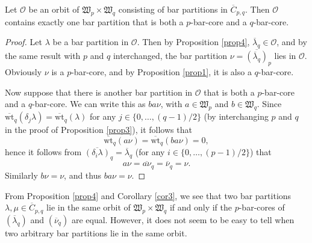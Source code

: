 \documentclass[ALCO, Unicode,published]{cedram}
\newcommand*\nicefrac[2]{#1/#2}
\begin{document}
\begin{coro}\label{cor3}
Let $\mathcal{O}$ be an orbit of $\mathfrak{W}_p\times\mathfrak{W}_q$ consisting of bar partitions in $\overline{C}_{p,q}$. Then $\mathcal{O}$ contains exactly one bar partition that is both a $p$-bar-core and a $q$-bar-core.
\end{coro}
\begin{proof}
Let $\lambda$ be a bar partition in $\mathcal{O}$. Then by Proposition \ref{prop4}, $\overline{\lambda}_q\in\mathcal{O}$, and by the same result with $p$ and $q$ interchanged, the bar partition $\nu=\overline{(\overline{\lambda}_q)}_p$ lies in $\mathcal{O}$. Obviously $\nu$ is a $p$-bar-core, and by Proposition \ref{prop1}, it is also a $q$-bar-core.

Now suppose that there is another bar partition in $\mathcal{O}$ that is both a $p$-bar-core and a $q$-bar-core. We can write this as $ba\nu$, with $a\in\mathfrak{W}_p$ and $b\in\mathfrak{W}_q$. Since $\overline{\text{wt}}_q(\delta_j\lambda)=\overline{\text{wt}}_q(\lambda)$ for any $j\in\{0,\dots,\nicefrac{(q-1)}{2}\}$ (by interchanging $p$ and $q$ in the proof of Proposition \ref{prop3}), it follows that 
$$\overline{\text{wt}}_q(a\nu)=\overline{\text{wt}}_q(ba\nu)=0,$$ 
hence it follows from $\overline{(\delta_i\lambda)}_q=\overline{\lambda}_q$ (for any $i\in\{0,\dots,\nicefrac{(p-1)}{2}\}$) that 
$$a\nu=\overline{a\nu}_q=\overline{\nu}_q=\nu.$$ 
Similarly $b\nu=\nu$, and thus $ba\nu=\nu$. 
\end{proof}

\begin{rema*}
From Proposition \ref{prop4} and Corollary \ref{cor3}, we see that two bar partitions $\lambda,\mu\in\overline{C}_{p,q}$ lie in the same orbit of $\mathfrak{W}_p\times\mathfrak{W}_q$ if and only if the $p$-bar-cores of $(\overline{\lambda}_q)$ and $(\overline{\nu}_q)$ are equal. However, it does not seem to be easy to tell when two arbitrary bar partitions lie in the same orbit.
\end{rema*}
\end{document}
